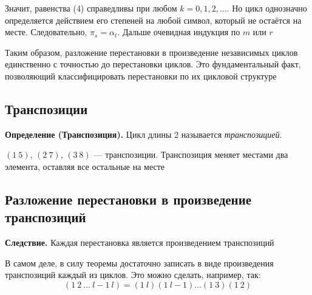 \documentclass[a4paper,12pt]{article}
\theoremstyle{definition}
\theoremstyle{plain}
\theoremstyle{remark}
\begin{document}
	Значит, равенства (4) справедливы при любом $k = 0, 1, 2, \dots$. Но цикл однозначно определяется действием его степеней на любой символ, который не остаётся на месте. Следовательно, $\pi_s = \alpha_t$. Дальше очевидная индукция по $m$ или $r$
	
	\begin{tcolorbox}[colback=red!5, colframe=red!70!black, title=Итог теоремы]
		Таким образом, разложение перестановки в произведение независимых циклов единственно с точностью до перестановки циклов. Это фундаментальный факт, позволяющий классифицировать перестановки по их цикловой структуре
	\end{tcolorbox}
	
	\subsection{Транспозиции}
	
	\noindent \textbf{Определение (Транспозиция).}
	Цикл длины 2 называется \textit{транспозицией}.
	
	\begin{tcolorbox}[colback=blue!5, colframe=blue!40!black, title=Пример]
		$(1\ 5)$, $(2\ 7)$, $(3\ 8)$ — транспозиции. Транспозиция меняет местами два элемента, оставляя все остальные на месте
	\end{tcolorbox}
	
	\subsection{Разложение перестановки в произведение транспозиций}
	
	\noindent \textbf{Следствие.}
	Каждая перестановка является произведением транспозиций
	
	В самом деле, в силу теоремы достаточно записать в виде произведения транспозиций каждый из циклов. Это можно сделать, например, так:
	\[
	(1\ 2\ \dots\ l-1\ l) = (1\ l)(1\ l-1)\dots(1\ 3)(1\ 2)
	\]
	
	
	
	
	
\end{document}
